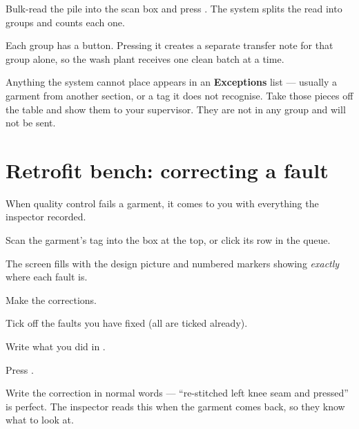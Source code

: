 Bulk-read the pile into the scan box and press . The system
splits the read into groups and counts each one.


Each group has a  button. Pressing it creates a separate
transfer note for that group alone, so the wash plant receives one clean batch at
a time.

\begin{warnbox}
Anything the system cannot place appears in an \textbf{Exceptions} list ---
usually a garment from another section, or a tag it does not recognise. Take
those pieces off the table and show them to your supervisor. They are not in
any group and will not be sent.
\end{warnbox}

\section{Retrofit bench: correcting a fault}

When quality control fails a garment, it comes to you with everything the
inspector recorded.


\begin{steps}
  \item Scan the garment's tag into the box at the top, or click its row in the
        queue.
  \item The screen fills with the design picture and numbered markers showing
        \emph{exactly} where each fault is.
  \item Make the corrections.
  \item Tick off the faults you have fixed (all are ticked already).
  \item Write what you did in .
  \item Press .
\end{steps}


\begin{tipbox}
Write the correction in normal words --- ``re-stitched left knee seam and
pressed'' is perfect. The inspector reads this when the garment comes back, so
they know what to look at.
\end{tipbox}

